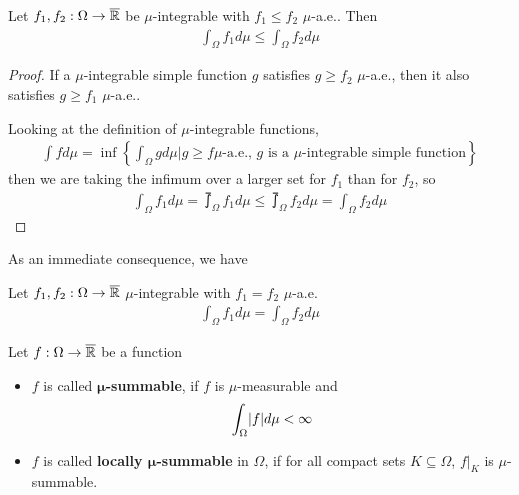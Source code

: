 \begin{prop}[Monotonicity]\label{prop:monotonicity-integral}
  Let $f_1,f_2: \Omega \to \overline{\mathbb{R}}$ be $\mu$-integrable with $f_1 \leq f_2$ $\mu$-a.e.. Then
  \begin{align*}
    \int_{\Omega} f_1 d \mu \leq \int_{\Omega} f_2 d \mu
  \end{align*}
\end{prop}
\begin{proof}
  If a $\mu$-integrable simple function $g$ satisfies $g \geq f_2$ $\mu$-a.e., then it also satisfies $g \geq f_1$ $\mu$-a.e..

  Looking at the definition of $\mu$-integrable functions, 
  \begin{align*}
    \int f d \mu = 
      \inf \left\{
        \int_{\Omega}g d \mu
        \big\vert g \geq f \mu\text{-a.e., $g$ is a $\mu$-integrable simple function}
      \right\}
  \end{align*}
  then we are taking the infimum over a larger set for $f_1$ than for $f_2$, so 
  \begin{align*}
    \int_{\Omega}f_1 d \mu 
    =
    \upint_{\Omega}f_1 d \mu
    \leq
    \upint_{\Omega}f_2 d \mu
    = \int_{\Omega}f_2 d \mu
  \end{align*}
\end{proof}
As an immediate consequence, we have
\begin{cor}[]\label{cor:same-integral}
  Let $f_1,f_2: \Omega \to \overline{\mathbb{R}}$ $\mu$-integrable with $f_1 = f_2$ $\mu$-a.e.
  \begin{align*}
    \int_{\Omega} f_1 d \mu = \int_{\Omega} f_2 d \mu
  \end{align*}
\end{cor}
\begin{dfn}[]
  Let $f: \Omega \to \overline{\mathbb{R}}$ be a function
  \begin{itemize}
    \item $f$ is called \textbf{$\bm{\mu}$-summable}, if $f$ is $\mu$-measurable and
      \begin{align*}
        \int_{\Omega} \abs{f} d \mu < \infty
      \end{align*}
    \item $f$ is called \textbf{locally $\bm{\mu}$-summable} in $\Omega$, if for all compact sets $K \subseteq \Omega$, $f|_K$ is $\mu$-summable.
  \end{itemize}
\end{dfn}


